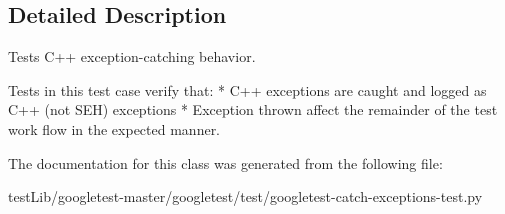 \subsection{Detailed Description}
\begin{DoxyVerb}Tests C++ exception-catching behavior.

   Tests in this test case verify that:
   * C++ exceptions are caught and logged as C++ (not SEH) exceptions
   * Exception thrown affect the remainder of the test work flow in the
     expected manner.
\end{DoxyVerb}
 

The documentation for this class was generated from the following file\+:\begin{DoxyCompactItemize}
\item 
test\+Lib/googletest-\/master/googletest/test/googletest-\/catch-\/exceptions-\/test.\+py\end{DoxyCompactItemize}
